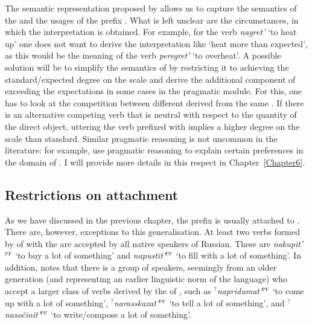The semantic representation proposed by \citet{Kagan:book} allows us to capture the semantics of the  and the  usages of the prefix . What is left unclear are the circumstances, in which the  interpretation is obtained. For example, for the verb \textit{nagret'} `to heat up' one does not want to derive the interpretation like `heat more than expected', as this would be the meaning of the verb \textit{peregret'} `to overheat'. A possible solution will be to simplify the semantics of  by restricting it to achieving the standard/expected degree on the scale and derive the additional component of exceeding the expectations in some cases in the pragmatic module. For this, one has to look at the competition between different  derived from the same . If there is an alternative competing verb that is neutral with respect to the quantity of the direct object, uttering the verb prefixed with  implies a higher degree on the scale than standard. Similar pragmatic reasoning is not uncommon in the literature: for example, \citet[21]{KennedyLevin:08} use pragmatic reasoning to explain certain preferences in the domain of . I will provide more details in this respect in Chapter~\ref{Chapter6}.

\subsection{Restrictions on attachment}
As we have discussed in the previous chapter, the  prefix  is usually attached to . There are, however, exceptions to this generalisation. At least two verbs formed by  of  with the   are accepted by all native speakers of Russian. These are \textit{nakupit'}$^{\textsc{pf}}$ `to buy a lot of something' and \textit{napustit'}$^{\textsc{pf}}$ `to fill with a lot of something'. In addition, \citet{Tatevosov:13a} notes that there is a group of speakers, seemingly from an older generation (and representing an earlier linguistic norm of the language) who accept a larger class of verbs derived by the  of , such as \textit{$^?$napridumat'}$^{\textsc{pf}}$ `to come up with a lot of something', \textit{$^?$narasskazat'}$^{\textsc{pf}}$ `to tell a lot of something', and \textit{$^?$naso\v{c}init'}$^{\textsc{pf}}$ `to write/compose a lot of something'.

